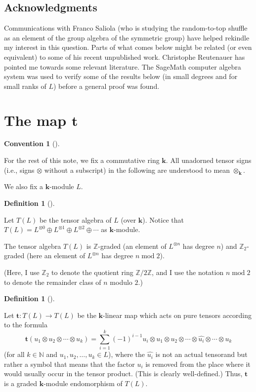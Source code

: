 \documentclass[numbers=enddot,12pt,final,onecolumn,notitlepage]{scrartcl}%
\theoremstyle{definition}
\newtheorem{defi}[theo]{Definition}
\newenvironment{definition}[1][]
{\begin{defi}[#1]\begin{leftbar}}
{\end{leftbar}\end{defi}}
\newtheorem{conv}[theo]{Convention}
\newenvironment{condition}[1][]
{\begin{conv}[#1]\begin{leftbar}}
{\end{leftbar}\end{conv}}
\let\sumnonlimits\sum
\renewcommand{\sum}{\sumnonlimits\limits}
\begin{document}
\subsection{Acknowledgments}

Communications with Franco Saliola (who is studying the random-to-top shuffle
as an element of the group algebra of the symmetric group) have helped
rekindle my interest in this question. Parts of what comes below might be
related (or even equivalent) to some of his recent unpublished work.
Christophe Reutenauer has pointed me towards some relevant literature. The
SageMath computer algebra system \cite{sage} was used to verify some of the
results below (in small degrees and for small ranks of $L$) before a general
proof was found.


\section{The map $\mathbf{t}$}

\begin{condition}
For the rest of this note, we fix a commutative ring $\mathbf{k}$. All
unadorned tensor signs (i.e., signs $\otimes$ without a subscript) in the
following are understood to mean $\otimes_{\mathbf{k}}$.

We also fix a $\mathbf{k}$-module $L$.
\end{condition}

\begin{definition}
Let $T\left(  L\right)  $ be the tensor algebra of $L$ (over $\mathbf{k}$).
Notice that $T\left(  L\right)  =L^{\otimes0}\oplus L^{\otimes1}\oplus
L^{\otimes2}\oplus\cdots$ as $\mathbf{k}$-module.

The tensor algebra $T\left(  L\right)  $ is $\mathbb{Z}$-graded (an element of
$L^{\otimes n}$ has degree $n$) and $\mathbb{Z}_{2}$-graded (here an element
of $L^{\otimes n}$ has degree $n\operatorname{mod}2$).
\end{definition}

(Here, I use $\mathbb{Z}_{2}$ to denote the quotient ring $\mathbb{Z}%
/2\mathbb{Z}$, and I use the notation $n\operatorname{mod}2$ to denote the
remainder class of $n$ modulo $2$.)

\begin{definition}
\label{def.t}Let $\mathbf{t}:T\left(  L\right)  \rightarrow T\left(  L\right)
$ be the $\mathbf{k}$-linear map which acts on pure tensors according to the
formula%
\[
\mathbf{t}\left(  u_{1}\otimes u_{2}\otimes\cdots\otimes u_{k}\right)
=\sum_{i=1}^{k}\left(  -1\right)  ^{i-1}u_{i}\otimes u_{1}\otimes u_{2}%
\otimes\cdots\otimes\widehat{u_{i}}\otimes\cdots\otimes u_{k}%
\]
(for all $k\in\mathbb{N}$ and $u_{1},u_{2},\ldots,u_{k}\in L$), where the
$\widehat{u_{i}}$ is not an actual tensorand but rather a symbol that means
that the factor $u_{i}$ is removed from the place where it would usually occur
in the tensor product. (This is clearly well-defined.) Thus, $\mathbf{t}$ is a
graded $\mathbf{k}$-module endomorphism of $T\left(  L\right)  $.
\end{definition}
\end{document}
